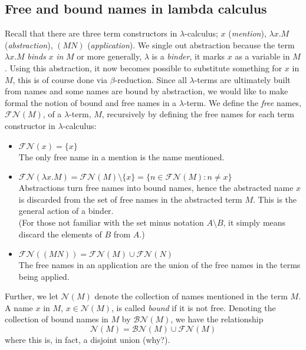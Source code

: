 \documentclass[12pt]{article}
\numberwithin{equation}{section}
\begin{document}
\subsection{Free and bound names in lambda calculus}
Recall that there are three term constructors in $\lambda$-calculus; $x$ (\emph{mention}), $\lambda x. M$ (\emph{abstraction}), $(M N)$ (\emph{application}). We single out abstraction because the term $\lambda x.M$ \emph{binds} $x$ \emph{in} $M$ or more generally, $\lambda$ is a \emph{binder}, it marks $x$ as a variable in $M$. Using this abstraction, it now becomes possible to substitute something for $x$ in $M$, this is of course done via $\beta$-reduction. Since all $\lambda$-terms are ultimately built from names and some names are bound by abstraction, we would like to make formal the notion of bound and free names in a $\lambda$-term. We define the \emph{free} names, $\mathcal{FN}(M)$, of a $\lambda$-term, $M$, recursively by defining the free names for each term constructor in $\lambda$-calculus:
\begin{itemize}
\item $\mathcal{FN}(x) = \{ x \}$ \\
The only free name in a mention is the name mentioned.

\item $\mathcal{FN}(\lambda x.M) = \mathcal{FN}(M) \setminus \{ x \} = \{ n \in \mathcal{FN}(M): n \neq x \}$ \\
Abstractions turn free names into bound names, hence the abstracted name $x$ is discarded from the set of free names in the abstracted term $M$. This is the general action of a binder.\\
(For those not familiar with the set minus notation $A \setminus B$, it simply means discard the elements of $B$ from $A$.)

\item $\mathcal{FN}((M N)) = \mathcal{FN}(M) \cup \mathcal{FN}(N)$ \\
The free names in an application are the union of the free names in the terms being applied.
\end{itemize}

Further, we let $\mathcal{N}(M)$ denote the collection of names mentioned in the term $M$. A name $x$ in $M$, $x \in \mathcal{N}(M)$, is called \emph{bound} if it is not free. Denoting the collection of bound names in $M$ by $\mathcal{BN}(M)$, we have the relationship
\[ \mathcal{N}(M)= \mathcal{BN}(M)\cup \mathcal{FN}(M) \]
where this is, in fact, a disjoint union (why?).
\end{document}

